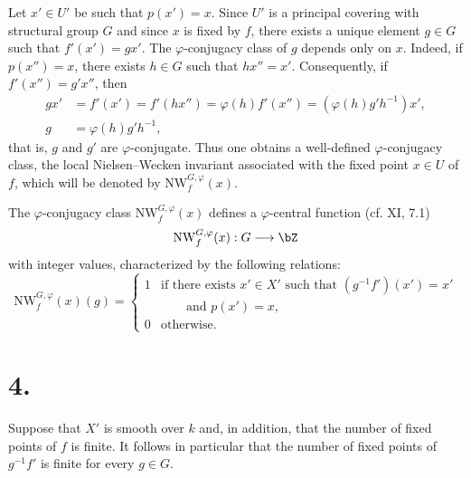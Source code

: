Let $x'\in U'$ be such that $p(x')=x$. Since $U'$ is a principal covering with structural group $G$ and since $x$ is fixed by $f$, there exists a unique element $g\in G$ such that $f'(x')=gx'$. The $\varphi$-conjugacy class of $g$ depends only on $x$. Indeed, if $p(x'')=x$, there exists $h\in G$ such that $hx''=x'$. Consequently, if $f'(x'')=g'x''$, then
\begin{align*}
gx'&=f'(x')=f'(hx'')=\varphi(h)f'(x'')=(\varphi(h)g'h^{-1})x',\\
g&=\varphi(h)g'h^{-1},
\end{align*}
that is, $g$ and $g'$ are $\varphi$-conjugate. Thus one obtains a well-defined $\varphi$-conjugacy class, the local Nielsen--Wecken invariant associated with the fixed point $x\in U$ of $f$, which will be denoted by $\mathrm{NW}_{f}^{G,\varphi}(x)$.

The $\varphi$-conjugacy class $\mathrm{NW}_{f}^{G,\varphi}(x)$ defines a $\varphi$-central function (cf. XI, 7.1)
\[
\mathrm{NW}_{f}^{G,\varphi}(x):G\longrightarrow \bZ
\]
with integer values, characterized by the following relations:
\begin{equation}\tag{3.1}
\mathrm{NW}_{f}^{G,\varphi}(x)(g)=
\begin{cases}
1&\text{if there exists }x'\in X'\text{ such that }(g^{-1}f')(x')=x'\\
 &\qquad\text{and }p(x')=x,\\
0&\text{otherwise.}
\end{cases}
\end{equation}

\section*{4.}
Suppose that $X'$ is smooth over $k$ and, in addition, that the number of fixed points of $f$ is finite. It follows in particular that the number of fixed points of $g^{-1}f'$ is finite for every $g\in G$.

